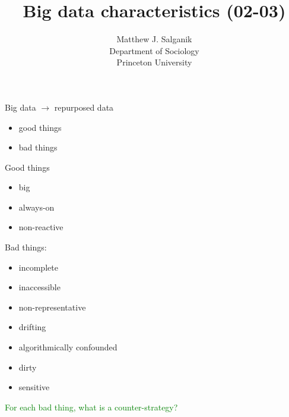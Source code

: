 \documentclass[aspectratio=169]{beamer}
\title[]{Big data characteristics (02-03)}
\author[]{Matthew J. Salganik\\Department of Sociology\\Princeton University}
\date[]{Soc 596: Computational Social Science
\vfill
\begin{flushright}
\vspace{0.6in}
\texttt{[image: figures/cc.png]}
\end{flushright}
}
\def\vf{\vfill}
\begin{document}
\frame{\titlepage}
\begin{frame}

Big data $\rightarrow$ repurposed data
\begin{itemize}
\item good things
\item bad things
\end{itemize}

\end{frame}
\begin{frame}

Good things
\begin{itemize}
\item big 
\item always-on
\item non-reactive 
\end{itemize}

\end{frame}
\begin{frame}

Bad things:
\begin{itemize}
\item incomplete
\item inaccessible
\item non-representative
\item drifting
\item algorithmically confounded
\item dirty
\item sensitive 
\end{itemize}
\vf
\pause
\textcolor{green}{For each bad thing, what is a counter-strategy?}

\end{frame}
\end{document}
